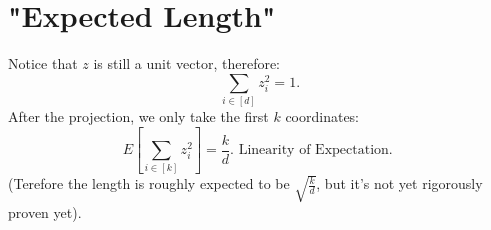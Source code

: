 \documentclass[12pt]{article}
\begin{document}
\section{"Expected Length"}
Notice that $z$ is still a unit vector, therefore:
$$
\sum _ { i \in [ d ] } z _ { i } ^ { 2 } = 1 .
$$
After the projection, we only take the first $k$ coordinates:
$$
E \left[ \sum _ { i \in [ k ] } z _ { i } ^ { 2 } \right] = \frac { k } { d } . \text { Linearity of Expectation. }
$$
(Terefore the length is roughly expected to be $\sqrt{\frac{k}{d}}$, but it's not yet rigorously proven yet).



\end{document}
